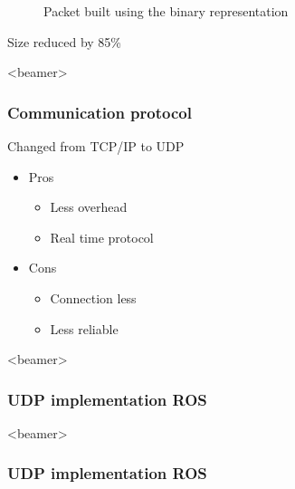 \begin{frame}
\begin{figure}[h]
\begin{minipage}{.45\textwidth}
{\begin{tikzpicture}
  \end{tikzpicture}
  }
  \caption{Packet built using the binary representation}
  \label{fig:new_packets}
\end{minipage}
\end{figure}
\begin{center}
  Size reduced by 85\%
  \end{center}
\end{frame}


\begin{frame}<beamer>
\frametitle{Communication protocol}

Changed from TCP/IP to UDP\vspace{1em}
\begin{itemize}
	\item Pros
	\begin{itemize}
	\item Less overhead
  \item Real time protocol   
	\end{itemize}
  \item Cons
  \begin{itemize}
  \item Connection less 
  \item Less reliable  
\end{itemize}
\end{itemize}
\end{frame}







\begin{frame}<beamer>
\frametitle{UDP implementation ROS}

\begin{figure}
\scalebox{0.75}{

}
\end{figure}

\end{frame}




\begin{frame}<beamer>
\frametitle{UDP implementation ROS}

\begin{figure}
\scalebox{0.75}{

}
\end{figure}


\end{frame}




